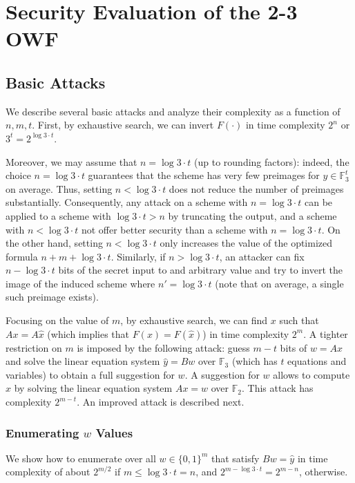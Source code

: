 \documentclass{article}
\begin{document}
\section{Security Evaluation of the 2-3 OWF}


\subsection{Basic Attacks}
\label{sec:basic}

We describe several basic attacks and analyze their complexity as a function of $n,m,t$.
First, by exhaustive search, we can invert $F(\cdot)$ in time complexity $2^n$ or $3^t = 2^{\log 3 \cdot t}$.

Moreover, we may assume that $n = \log 3 \cdot t$ (up to rounding factors): indeed, the choice $n = \log 3 \cdot t$ guarantees that the scheme has very few preimages for $y \in \mathbb{F}_3^t$ on average. Thus, setting $n < \log 3 \cdot t$ does not reduce the number of preimages substantially. Consequently, any attack on a scheme with $n = \log 3 \cdot t$ can be applied to a scheme with $\log 3 \cdot t > n$ by truncating the output, and a scheme with $n < \log 3 \cdot t$ not offer better security than a scheme with $n = \log 3 \cdot t$. On the other hand, setting $n < \log 3 \cdot t$ only increases the value of the optimized formula $n+m+\log 3 \cdot t$. Similarly, if $n > \log 3 \cdot t$, an attacker can fix $n - \log 3 \cdot t$ bits of the secret input to and arbitrary value and try to invert the image of the induced scheme where $n' = \log 3 \cdot t$ (note that on average, a single such preimage exists).

Focusing on the value of $m$, by exhaustive search, we can find $x$ such that $Ax = A\hat{x}$ (which implies that $F(x) = F(\hat{x})$) in time complexity $2^m$.
A tighter restriction on $m$ is imposed by the following attack: guess $m - t$ bits of $w = Ax$ and solve the linear equation system $\hat{y} = Bw$ over $\mathbb{F}_3$ (which has $t$ equations and variables) to obtain a full suggestion for $w$. A suggestion for $w$ allows to compute $x$ by solving the linear equation system $Ax=w$ over $\mathbb{F}_2$. This attack has complexity $2^{m-t}$. An improved attack is described next.

\subsubsection*{Enumerating $w$ Values}

We show how to enumerate over all $w \in \{0,1\}^m$ that satisfy $B w = \hat{y}$ in time complexity of about $2^{m/2}$ if $m \leq \log 3 \cdot t = n$, and $2^{m - \log 3 \cdot t} = 2^{m - n}$, otherwise.
\end{document}
